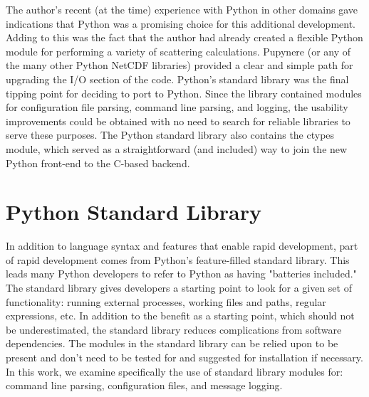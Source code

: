 \documentclass[twocolumn]{article}
\begin{document}
The author's recent (at the time) experience with Python in other domains gave
indications that Python was a promising choice for this additional development.
Adding to this was the fact that the author had already created a flexible Python
module for performing a variety of scattering calculations. Pupynere (or any
of the many other Python NetCDF libraries) provided a clear and simple path
for upgrading the I/O section of the code. Python's standard
library was the final tipping point for deciding to port to Python. Since the
library contained modules for configuration file parsing, command line parsing,
and logging, the usability improvements could be obtained with no need to search
for reliable libraries to serve these purposes. The Python standard library also
contains the ctypes module, which served as a straightforward (and included) way
to join the new Python front-end to the C-based backend.


\section{Python Standard Library}
In addition to language syntax and features that enable rapid development, part of 
rapid development comes from Python's feature-filled standard library. This leads
many Python developers to refer to Python as having "batteries included." The standard
library gives developers a starting point to look for a given set of functionality: 
running external processes, working files and paths, regular expressions, etc. In addition
to the benefit as a starting point, which should not be underestimated, the standard
library reduces complications from software dependencies. The modules in the standard
library can be relied upon to be present and don't need to be tested for and suggested
for installation if necessary. In this work, we examine specifically the use of
standard library modules for: command line parsing, configuration files, and message logging.
\end{document}
